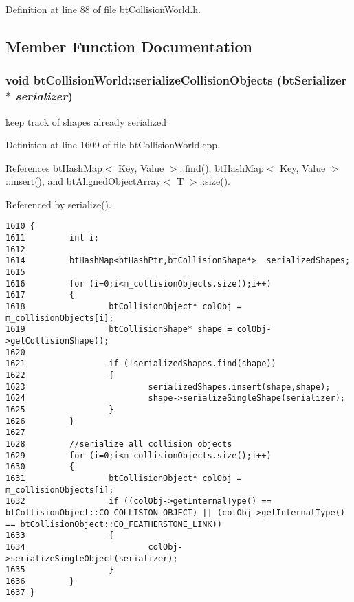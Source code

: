 Definition at line 88 of file btCollisionWorld.h.

\subsection{Member Function Documentation}
\hypertarget{classbt_collision_world_eed5861d66035fa72f40e27b04bdc056}{
\subsubsection[serializeCollisionObjects]{\setlength{\rightskip}{0pt plus 5cm}void btCollisionWorld::serializeCollisionObjects (btSerializer $\ast$ {\em serializer})}}
\label{classbt_collision_world_eed5861d66035fa72f40e27b04bdc056}




keep track of shapes already serialized 

Definition at line 1609 of file btCollisionWorld.cpp.

References btHashMap$<$ Key, Value $>$::find(), btHashMap$<$ Key, Value $>$::insert(), and btAlignedObjectArray$<$ T $>$::size().

Referenced by serialize().

\begin{Code}\begin{verbatim}1610 {
1611         int i;
1612 
1614         btHashMap<btHashPtr,btCollisionShape*>  serializedShapes;
1615 
1616         for (i=0;i<m_collisionObjects.size();i++)
1617         {
1618                 btCollisionObject* colObj = m_collisionObjects[i];
1619                 btCollisionShape* shape = colObj->getCollisionShape();
1620 
1621                 if (!serializedShapes.find(shape))
1622                 {
1623                         serializedShapes.insert(shape,shape);
1624                         shape->serializeSingleShape(serializer);
1625                 }
1626         }
1627 
1628         //serialize all collision objects
1629         for (i=0;i<m_collisionObjects.size();i++)
1630         {
1631                 btCollisionObject* colObj = m_collisionObjects[i];
1632                 if ((colObj->getInternalType() == btCollisionObject::CO_COLLISION_OBJECT) || (colObj->getInternalType() == btCollisionObject::CO_FEATHERSTONE_LINK))
1633                 {
1634                         colObj->serializeSingleObject(serializer);
1635                 }
1636         }
1637 }
\end{verbatim}
\end{Code}




